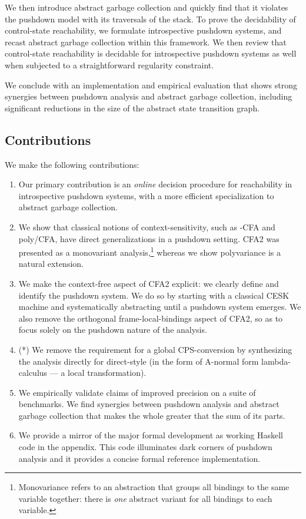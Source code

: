 We then introduce abstract garbage collection and quickly find
that it violates the pushdown model
with its traversals of the stack.
To prove the decidability of control-state reachability,
we formulate introspective pushdown systems, and 
recast abstract garbage collection within this framework.
We then review that control-state reachability is decidable for
introspective pushdown systems as well when
subjected to a straightforward regularity constraint.

We conclude with an implementation and empirical evaluation that shows strong
synergies between pushdown analysis and abstract garbage collection, including
significant reductions in the size of the abstract state transition graph.

\subsection{Contributions}
We make the following contributions:
\begin{enumerate}
\item Our primary contribution is an \emph{online} decision procedure
  for reachability in introspective pushdown systems, with a more
  efficient specialization to abstract garbage collection.


\item We show that classical notions of context-sensitivity, such as
  -CFA and poly/CFA, have direct generalizations in a pushdown
  setting.  CFA2 was presented as a monovariant
  analysis,\footnote{Monovariance refers to an abstraction that groups
    all bindings to the same variable together: there is \emph{one}
    abstract variant for all bindings to each variable.} whereas we
  show polyvariance is a natural extension.

\item We make the context-free aspect of CFA2 explicit: we clearly define and
identify the pushdown system.
We do so by starting with a classical CESK machine and systematically
abstracting until a pushdown system emerges.
We also remove the orthogonal frame-local-bindings aspect of CFA2, so as to
focus solely on the pushdown nature of the analysis.


\item (*) We remove the requirement for a global CPS-conversion
by synthesizing the analysis directly for direct-style (in
    the form of A-normal form lambda-calculus --- a local transformation).


\item We empirically validate claims of improved
precision on a suite of benchmarks.
We find synergies between 
pushdown analysis 
and
abstract garbage collection 
that makes the whole greater that the sum of its parts.

\item
We provide a mirror of the major formal development as working 
Haskell code in the appendix.  
This code illuminates dark corners
of pushdown analysis and it 
provides a concise formal reference implementation.


\end{enumerate}

